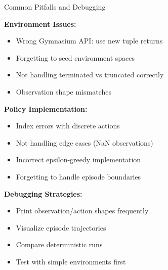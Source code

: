 \documentclass[aspectratio=169,10pt]{beamer}
\begin{document}
\begin{frame}{Common Pitfalls and Debugging}

\textbf{Environment Issues:}
\begin{itemize}
    \item Wrong Gymnasium API: use new tuple returns
    \item Forgetting to seed environment spaces
    \item Not handling terminated vs truncated correctly
    \item Observation shape mismatches
\end{itemize}

\vfill

\textbf{Policy Implementation:}
\begin{itemize}
    \item Index errors with discrete actions
    \item Not handling edge cases (NaN observations)
    \item Incorrect epsilon-greedy implementation
    \item Forgetting to handle episode boundaries
\end{itemize}

\vfill

\textbf{Debugging Strategies:}
\begin{itemize}
    \item Print observation/action shapes frequently
    \item Visualize episode trajectories
    \item Compare deterministic runs
    \item Test with simple environments first
\end{itemize}

\end{frame}
\end{document}
